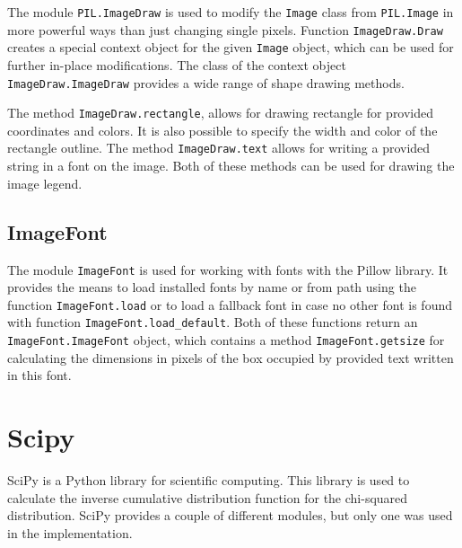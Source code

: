 \documentclass[
  digital, %
  oneside, %
  lof,     %
  lot,     %
]{fithesis4}
\begin{document}
The module \texttt{PIL.ImageDraw} is used to modify the \texttt{Image} class from \texttt{PIL.Image} in more powerful ways than just changing single pixels.
Function \texttt{ImageDraw.Draw} creates a special context object for the given \texttt{Image} object, which can be used for further in-place modifications.
The class of the context object \texttt{ImageDraw.ImageDraw} provides a wide range of shape drawing methods.

The method \texttt{ImageDraw.rectangle}, allows for drawing rectangle for provided coordinates and colors. It is also possible to specify the width and color of the rectangle outline. The method \texttt{ImageDraw.text} allows for writing a provided string in a font on the image. Both of these methods can be used for drawing the image legend. \cite{pillowimagedraw}

\subsection{ImageFont}

The module \texttt{ImageFont} is used for working with fonts with the Pillow library.
It provides the means to load installed fonts by name or from path using the function \texttt{ImageFont.load} or to load a fallback font in case no other font is found with function \texttt{ImageFont.load\_default}.
Both of these functions return an \texttt{ImageFont.ImageFont} object, which contains a method \texttt{ImageFont.getsize} for calculating the dimensions in pixels of the box occupied by provided text written in this font. \cite{pillowimagefont}



\section{Scipy}
SciPy\cite{scipy20} is a Python library for scientific computing.
This library is used to calculate the inverse cumulative distribution function for the chi-squared distribution.
SciPy provides a couple of different modules, but only one was used in the implementation.
\end{document}
